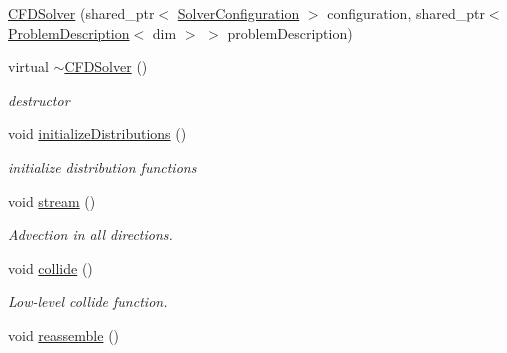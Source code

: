 \begin{DoxyCompactItemize}
\item 
\hyperlink{classnatrium_1_1CFDSolver_a2a459e7f9d5feb0d216f869812723af2}{C\-F\-D\-Solver} (shared\-\_\-ptr$<$ \hyperlink{classnatrium_1_1SolverConfiguration}{Solver\-Configuration} $>$ configuration, shared\-\_\-ptr$<$ \hyperlink{classnatrium_1_1ProblemDescription}{Problem\-Description}$<$ dim $>$ $>$ problem\-Description)
\item 
\hypertarget{classnatrium_1_1CFDSolver_a7ca9bd709255ac87b34f869c984b913b}{virtual \hyperlink{classnatrium_1_1CFDSolver_a7ca9bd709255ac87b34f869c984b913b}{$\sim$\-C\-F\-D\-Solver} ()}\label{classnatrium_1_1CFDSolver_a7ca9bd709255ac87b34f869c984b913b}

\begin{DoxyCompactList}\small\item\em destructor \end{DoxyCompactList}\item 
\hypertarget{classnatrium_1_1CFDSolver_abe627b0bbde0635abb30b9bea4c72dc1}{void \hyperlink{classnatrium_1_1CFDSolver_abe627b0bbde0635abb30b9bea4c72dc1}{initialize\-Distributions} ()}\label{classnatrium_1_1CFDSolver_abe627b0bbde0635abb30b9bea4c72dc1}

\begin{DoxyCompactList}\small\item\em initialize distribution functions \end{DoxyCompactList}\item 
\hypertarget{classnatrium_1_1CFDSolver_ac32a318e504b31195eb61c2cdc2659fe}{void \hyperlink{classnatrium_1_1CFDSolver_ac32a318e504b31195eb61c2cdc2659fe}{stream} ()}\label{classnatrium_1_1CFDSolver_ac32a318e504b31195eb61c2cdc2659fe}

\begin{DoxyCompactList}\small\item\em Advection in all directions. \end{DoxyCompactList}\item 
\hypertarget{classnatrium_1_1CFDSolver_ac9bec7d0c4bcd5e02c5213ec09438c02}{void \hyperlink{classnatrium_1_1CFDSolver_ac9bec7d0c4bcd5e02c5213ec09438c02}{collide} ()}\label{classnatrium_1_1CFDSolver_ac9bec7d0c4bcd5e02c5213ec09438c02}

\begin{DoxyCompactList}\small\item\em Low-\/level collide function. \end{DoxyCompactList}\item 
\hypertarget{classnatrium_1_1CFDSolver_a604212a1f6cd2549b8f60ab26b14de00}{void \hyperlink{classnatrium_1_1CFDSolver_a604212a1f6cd2549b8f60ab26b14de00}{reassemble} ()}\label{classnatrium_1_1CFDSolver_a604212a1f6cd2549b8f60ab26b14de00}


\end{DoxyCompactItemize}
